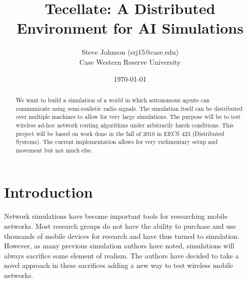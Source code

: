 \documentclass[12pt]{article}
\title{Tecellate: A Distributed Environment for AI Simulations}
\author{
        Steve Johnson (srj15@case.edu)\\
        Case Western Reserve University\\
}
\date{\today}
\begin{document}
\doublespacing
\maketitle


\begin{abstract}
    We want to build a simulation of a world in which autonomous agents can communicate using semi-realistic radio signals. The simulation itself can be distributed over multiple machines to allow for very large simulations. The purpose will be to test wireless ad-hoc network routing algorithms under arbitrarily harsh conditions.
    This project will be based on work done in the fall of 2010 in EECS 423 (Distributed Systems). The current implementation allows for very rudimentary setup and movement but not much else.
\end{abstract}

\section{Introduction}

Network simulations have become important tools for researching mobile networks. Most research groups do not have the ability to purchase and use thousands of mobile devices for research and have thus turned to simulation. However, as many previous simulation authors have noted, simulations will always sacrifice some element of realism. The authors have decided to take a novel approach in these sacrifices adding a new way to test wireless mobile networks.













% 
% 
\end{document}

